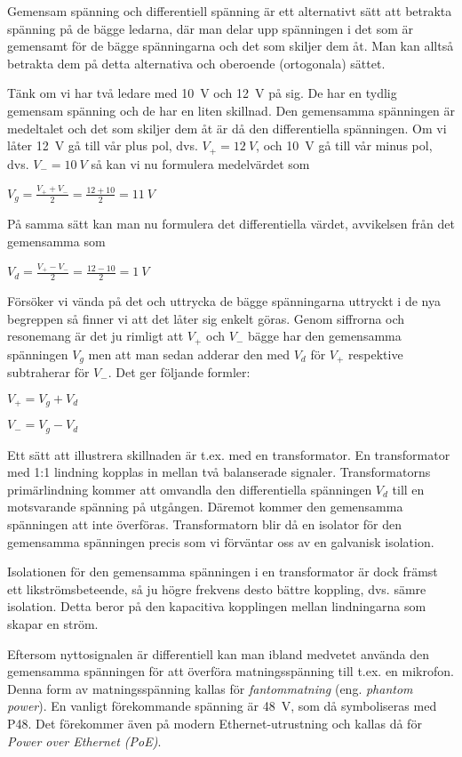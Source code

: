 Gemensam spänning och differentiell spänning är ett alternativt sätt att
betrakta spänning på de bägge ledarna, där man delar upp spänningen i det som
är gemensamt för de bägge spänningarna och det som skiljer dem åt. Man kan
alltså betrakta dem på detta alternativa och oberoende (ortogonala) sättet.

Tänk om vi har två ledare med 10~V och 12~V på sig. De har en tydlig gemensam
spänning och de har en liten skillnad. Den gemensamma spänningen är medeltalet
och det som skiljer dem åt är då den differentiella spänningen. Om vi låter
12~V gå till vår plus pol, dvs. \(V_+ = 12\ V\), och 10~V gå till vår minus pol,
dvs. \(V_- = 10\ V\) så kan vi nu formulera medelvärdet som

\(V_g = \frac{V_+ + V_-}{2} = \frac{12+10}{2} = 11\ V\)

På samma sätt kan man nu formulera det differentiella värdet, avvikelsen från
det gemensamma som

\(V_d = \frac{V_+ - V_-}{2} = \frac{12-10}{2} = 1\ V\)

Försöker vi vända på det och uttrycka de bägge spänningarna uttryckt i de nya
begreppen så finner vi att det låter sig enkelt göras. Genom siffrorna och
resonemang är det ju rimligt att \(V_+\) och \(V_-\) bägge har den gemensamma
spänningen \(V_g\) men att man sedan adderar den med \(V_d\) för \(V_+\)
respektive subtraherar för \(V_-\). Det ger följande formler:

\(V_+ = V_g + V_d\)

\(V_- = V_g - V_d\)

Ett sätt att illustrera skillnaden är t.ex. med en transformator.
En transformator med 1:1 lindning kopplas in mellan två balanserade signaler.
Transformatorns primärlindning kommer att omvandla den differentiella spänningen
\(V_d\) till en motsvarande spänning på utgången. Däremot kommer den gemensamma
spänningen att inte överföras. Transformatorn blir då en isolator för den
gemensamma spänningen precis som vi förväntar oss av en galvanisk isolation.

Isolationen för den gemensamma spänningen i en transformator är dock främst ett
likströmsbeteende, så ju högre frekvens desto bättre koppling, dvs. sämre
isolation. Detta beror på den kapacitiva kopplingen mellan lindningarna som
skapar en ström.

Eftersom nyttosignalen är differentiell kan man ibland medvetet använda den
gemensamma spänningen för att överföra matningsspänning till t.ex. en mikrofon.
Denna form av matningsspänning kallas för \emph{fantommatning}
(eng. \emph{phantom power}). En vanligt förekommande spänning är 48~V, som då
symboliseras med P48. Det förekommer även på modern Ethernet-utrustning och
kallas då för \emph{Power over Ethernet (PoE)}.


